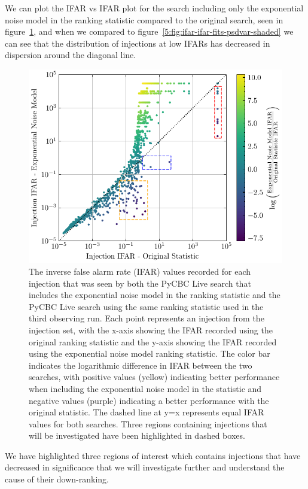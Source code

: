 We can plot the IFAR vs IFAR plot for the search including only the exponential noise model in the ranking statistic compared to the original search, seen in figure~\ref{5:fig:ifar-ifar-fits-only-regions}, and when we compared to figure~\ref{5:fig:ifar-ifar-fits-psdvar-shaded} we can see that the distribution of injections at low IFARs has decreased in dispersion around the diagonal line.
% 
\begin{figure}
       \centering
    \includegraphics[width=1.0\textwidth]{images/5_pycbclive/fits-only/fits_only_ifar_vs_ifar_regions.pdf}
    \caption{The inverse false alarm rate (IFAR) values recorded for each injection that was seen by both the PyCBC Live search that includes the exponential noise model in the ranking statistic and the PyCBC Live search using the same ranking statistic used in the third observing run. Each point represents an injection from the injection set, with the x-axis showing the IFAR recorded using the original ranking statistic and the y-axis showing the IFAR recorded using the exponential noise model ranking statistic. The color bar indicates the logarithmic difference in IFAR between the two searches, with positive values (yellow) indicating better performance when including the exponential noise model in the statistic and negative values (purple) indicating a better performance with the original statistic. The dashed line at y=x represents equal IFAR values for both searches. Three regions containing injections that will be investigated have been highlighted in dashed boxes.}
    \label{5:fig:ifar-ifar-fits-only-regions}
\end{figure}
%
We have highlighted three regions of interest which contains injections that have decreased in significance that we will investigate further and understand the cause of their down-ranking.

